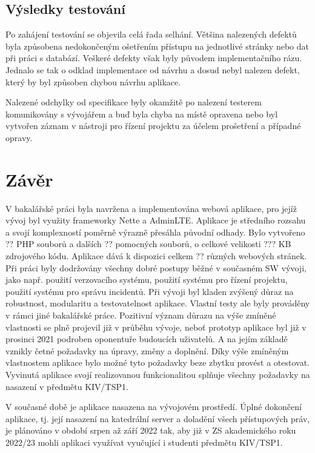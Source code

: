 \documentclass[czech,BP]{thesiskiv}
\begin{document}
	\section{Výsledky testování}
	\par Po zahájení testování se objevila celá řada selhání. Většina nalezených defektů byla způsobena nedokončeným ošetřením přístupu na jednotlivé stránky nebo  dat při práci s databází. Veškeré defekty však byly původem implementačního rázu. Jednalo se tak o odklad implementace od návrhu a dosud nebyl nalezen defekt, který by byl způsoben chybou návrhu aplikace.
	\par Nalezené odchylky od specifikace byly okamžitě po nalezení testerem komunikovány s vývojářem a buď byla chyba na místě opravena nebo byl vytvořen záznam v nástroji pro řízení projektu za účelem prošetření a případné opravy.  
\chapter{Závěr}
	\par V bakalářské práci byla navržena a implementována webová aplikace, pro jejíž vývoj byl využity frameworky Nette a AdminLTE.
	Aplikace je středního rozsahu a svojí komplexností poměrně výrazně přesáhla původní odhady. Bylo vytvořeno ?? PHP souborů a dalších ?? pomocných souborů, o celkové velikosti ??? KB zdrojového kódu. Aplikace dává k dispozici celkem ?? různých webových stránek.
	Při práci byly dodržovány všechny dobré postupy běžné v současném SW vývoji, jako např. použití verzovacího systému, použití systému pro řízení projektu, použití systému pro správu incidentů. 
	Při vývoji byl kladen zvýšený důraz na robustnost, modularitu a testovatelnost aplikace. Vlastní testy ale byly prováděny v rámci jiné bakalářské práce. Pozitivní význam důrazu na výše zmíněné vlastnosti se plně projevil již v průběhu vývoje, neboť prototyp aplikace byl již v prosinci 2021 podroben oponentuře budoucích uživatelů. A na jejím základě vznikly četné požadavky na úpravy, změny a doplnění. Díky výše zmíněným vlastnostem aplikace bylo možné tyto požadavky beze zbytku provést a otestovat.
	Vyvinutá aplikace svojí realizovanou funkcionalitou splňuje všechny požadavky na nasazení v předmětu KIV/TSP1.
	
	V současné době je aplikace nasazena na vývojovém prostředí. Úplné dokončení aplikace, tj. její nasazení na katedrální server a doladění všech přístupových práv, je plánováno v období srpen až září 2022 tak, aby již v ZS akademického roku 2022/23 mohli aplikaci využívat vyučující i studenti předmětu KIV/TSP1.
\end{document}
